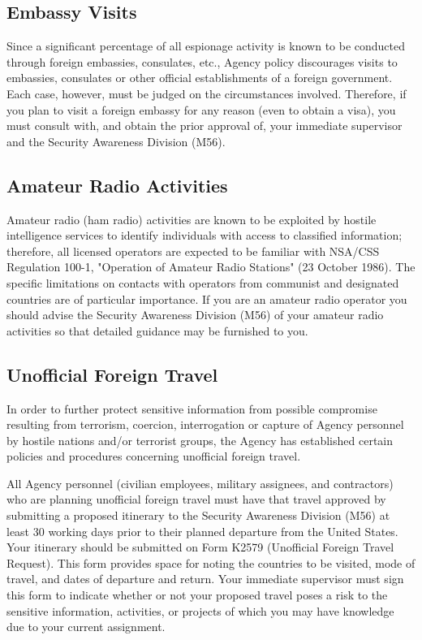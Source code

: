 \documentclass[a4]{article}
\begin{document}
\subsection{Embassy Visits}

Since a significant percentage of all espionage activity is known to be
conducted through foreign embassies, consulates, etc., Agency policy
discourages visits to embassies, consulates or other official establishments of
a foreign government.  Each case, however, must be judged on the circumstances
involved.  Therefore, if you plan to visit a foreign embassy for any reason
(even to obtain a visa), you must consult with, and obtain the prior approval
of, your immediate supervisor and the Security Awareness Division (M56).

\subsection{Amateur Radio Activities}

Amateur radio (ham radio) activities are known to be exploited by hostile
intelligence services to identify individuals with access to classified
information; therefore, all licensed operators are expected to be familiar
with NSA/CSS Regulation 100-1, "Operation of Amateur Radio Stations" (23
October 1986).  The specific limitations on contacts with operators from
communist and designated countries are of particular importance.  If you are
an amateur radio operator you should advise the Security Awareness Division
(M56) of your amateur radio activities so that detailed guidance may be
furnished to you.

\subsection{Unofficial Foreign Travel}

In order to further protect sensitive information from possible compromise
resulting from terrorism, coercion, interrogation or capture of Agency
personnel by hostile nations and/or terrorist groups, the Agency has
established certain policies and procedures concerning unofficial foreign
travel.

All Agency personnel (civilian employees, military assignees, and contractors)
who are planning unofficial foreign travel must have that travel approved by
submitting a proposed itinerary to the Security Awareness Division (M56) at
least 30 working days prior to their planned departure from the United States.
Your itinerary should be submitted on Form K2579 (Unofficial Foreign Travel
Request).  This form provides space for noting the countries to be visited,
mode of travel, and dates of departure and return.  Your immediate supervisor
must sign this form to indicate whether or not your proposed travel poses a
risk to the sensitive information, activities, or projects of which you may
have knowledge due to your current assignment.
\end{document}
